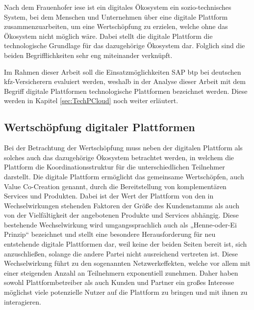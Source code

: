 Nach dem Frauenhofer \ac{iese} ist ein digitales Ökosystem ein sozio-technisches System, bei dem Menschen und Unternehmen über eine digitale Plattform zusammenzuarbeiten, um eine Wertschöpfung zu erzielen, welche ohne das Ökosystem nicht möglich wäre. \autocite[Vgl.][S. 376]{MULLERSTEWENS2019} Dabei stellt die digitale Plattform die technologische Grundlage für das dazugehörige Ökosystem dar. \autocite[Vgl.][S. 376]{IESE2021} Folglich sind die beiden Begrifflichkeiten sehr eng miteinander verknüpft.

Im Rahmen dieser Arbeit soll die Einsatzmöglichkeiten SAP \ac{btp} bei deutschen \ac{kfz}-Versicherern evaluiert werden, weshalb in der Analyse dieser Arbeit mit dem Begriff digitale Plattformen technologische Plattformen bezeichnet werden. Diese werden in Kapitel \ref{sec:TechPCloud} noch weiter erläutert. 



\subsection{Wertschöpfung digitaler Plattformen}

Bei der Betrachtung der Wertschöpfung muss neben der digitalen Plattform als solches auch das dazugehörige Ökosystem betrachtet werden, in welchem die Plattform die Koordinationsstruktur für die unterschiedlichen Teilnehmer darstellt. Die digitale Plattform ermöglicht das gemeinsame Wertschöpfen, auch Value Co-Creation genannt, durch die Bereitstellung von komplementären Services und Produkten. Dabei ist der Wert der Plattform von den in Wechselwirkungen stehenden Faktoren der Größe des Kundenstamms als auch von der Vielfältigkeit der angebotenen Produkte und Services abhängig. Diese bestehende Wechselwirkung wird umgangssprachlich auch als „Henne-oder-Ei Prinzip“ bezeichnet und stellt eine besondere Herausforderung für neu entstehende digitale Plattformen dar, weil keine der beiden Seiten bereit ist, sich anzuschließen, solange die andere Partei nicht ausreichend vertreten ist. \autocite[Vgl.][S. 310]{CAILLAUD2003} 
Diese Wechselwirkung führt zu den sogenannten Netzwerkeffekten, welche vor allem mit einer steigenden Anzahl an Teilnehmern exponentiell zunehmen. Daher haben sowohl Plattformbetreiber als auch Kunden und Partner ein großes Interesse möglichst viele potenzielle Nutzer auf die Plattform zu bringen und mit ihnen zu interagieren. \autocite[Vgl.][S. 596-600]{HAHN2016} 

